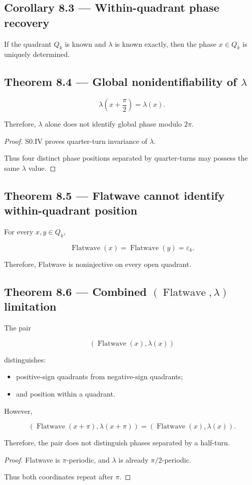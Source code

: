 \documentclass[11pt,oneside,openany]{book}
\newcommand{\PCsubsection}[1]{%
  \subsection*{#1}%
}
\begin{document}
\PCsubsection{Corollary 8.3 --- Within-quadrant phase recovery}

If the quadrant \(Q_k\) is known and \(\lambda\) is known exactly, then the phase \(x\in Q_k\) is uniquely determined.

\PCsubsection{Theorem 8.4 --- Global nonidentifiability of \(\lambda\)}

\[
\boxed{ \lambda\left(x+\frac{\pi}{2}\right)=\lambda(x). }
\]

Therefore, \(\lambda\) alone does not identify global phase modulo \(2\pi\).

\begin{proof}
S0.IV proves quarter-turn invariance of \(\lambda\).

Thus four distinct phase positions separated by quarter-turns may possess the same \(\lambda\) value.

\end{proof}

\PCsubsection{Theorem 8.5 --- Flatwave cannot identify within-quadrant position}

For every \(x,y\in Q_k\),

\[
\operatorname{Flatwave}(x) = \operatorname{Flatwave}(y) = \varepsilon_k.
\]

Therefore, Flatwave is noninjective on every open quadrant.

\PCsubsection{Theorem 8.6 --- Combined \((\operatorname{Flatwave},\lambda)\) limitation}

The pair

\[
\left( \operatorname{Flatwave}(x), \lambda(x) \right)
\]

distinguishes:

\begin{itemize}
\item positive-sign quadrants from negative-sign quadrants;
\item and position within a quadrant.
\end{itemize}
However,

\[
\boxed{ \left( \operatorname{Flatwave}(x+\pi), \lambda(x+\pi) \right) = \left( \operatorname{Flatwave}(x), \lambda(x) \right). }
\]

Therefore, the pair does not distinguish phases separated by a half-turn.

\begin{proof}
Flatwave is \(\pi\)-periodic, and \(\lambda\) is already \(\pi/2\)-periodic.

Thus both coordinates repeat after \(\pi\).

\end{proof}
\end{document}
